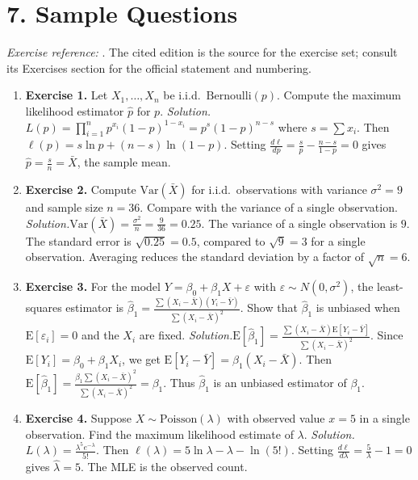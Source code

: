 \section*{7. Sample Questions}
\emph{Exercise reference:} \cite{statistics_ref1}. The cited edition is the source for the exercise set; consult its Exercises section for the official statement and numbering.
\begin{enumerate}[leftmargin=*,itemsep=0.9em]
\item \textbf{Exercise 1.} Let $X_1, \ldots, X_n$ be i.i.d.\ $\mathrm{Bernoulli}(p)$. Compute the maximum likelihood estimator $\hat{p}$ for $p$. \emph{Solution.}$L(p) = \prod_{i=1}^n p^{x_i}(1-p)^{1-x_i} = p^{s}(1-p)^{n-s}$ where $s = \sum x_i$. Then $\ell(p) = s\ln p + (n-s)\ln(1-p)$. Setting $\frac{d\ell}{dp} = \frac{s}{p} - \frac{n-s}{1-p} = 0$ gives $\hat{p} = \frac{s}{n} = \bar{X}$, the sample mean.

\item \textbf{Exercise 2.} Compute $\mathrm{Var}(\bar{X})$ for i.i.d.\ observations with variance $\sigma^2 = 9$ and sample size $n = 36$. Compare with the variance of a single observation. \emph{Solution.}$\mathrm{Var}(\bar{X}) = \frac{\sigma^2}{n} = \frac{9}{36} = 0.25$. The variance of a single observation is $9$. The standard error is $\sqrt{0.25} = 0.5$, compared to $\sqrt{9} = 3$ for a single observation. Averaging reduces the standard deviation by a factor of $\sqrt{n} = 6$.

\item \textbf{Exercise 3.} For the model $Y = \beta_0 + \beta_1 X + \varepsilon$ with $\varepsilon \sim N(0, \sigma^2)$, the least-squares estimator is $\hat{\beta}_1 = \frac{\sum(X_i - \bar{X})(Y_i - \bar{Y})}{\sum(X_i - \bar{X})^2}$. Show that $\hat{\beta}_1$ is unbiased when $\mathrm{E}[\varepsilon_i] = 0$ and the $X_i$ are fixed. \emph{Solution.}$\mathrm{E}[\hat{\beta}_1] = \frac{\sum(X_i - \bar{X})\mathrm{E}[Y_i - \bar{Y}]}{\sum(X_i - \bar{X})^2}$. Since $\mathrm{E}[Y_i] = \beta_0 + \beta_1 X_i$, we get $\mathrm{E}[Y_i - \bar{Y}] = \beta_1(X_i - \bar{X})$. Then $\mathrm{E}[\hat{\beta}_1] = \frac{\beta_1 \sum(X_i - \bar{X})^2}{\sum(X_i - \bar{X})^2} = \beta_1$. Thus $\hat{\beta}_1$ is an unbiased estimator of $\beta_1$.

\item \textbf{Exercise 4.} Suppose $X \sim \mathrm{Poisson}(\lambda)$ with observed value $x = 5$ in a single observation. Find the maximum likelihood estimate of $\lambda$. \emph{Solution.}$L(\lambda) = \frac{\lambda^5 e^{-\lambda}}{5!}$. Then $\ell(\lambda) = 5\ln\lambda - \lambda - \ln(5!)$. Setting $\frac{d\ell}{d\lambda} = \frac{5}{\lambda} - 1 = 0$ gives $\hat{\lambda} = 5$. The MLE is the observed count.


\end{enumerate}
